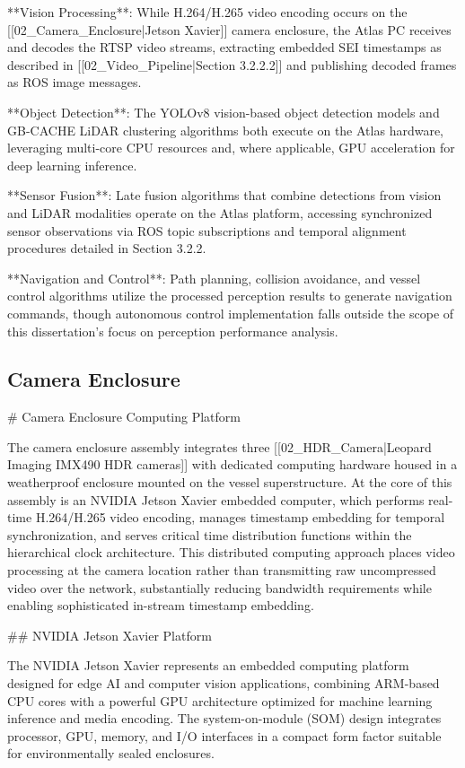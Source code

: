 \documentclass{erauthesis}
\begin{document}
**Vision Processing**: While H.264/H.265 video encoding occurs on the [[02_Camera_Enclosure|Jetson Xavier]] camera enclosure, the Atlas PC receives and decodes the RTSP video streams, extracting embedded SEI timestamps as described in [[02_Video_Pipeline|Section 3.2.2.2]] and publishing decoded frames as ROS image messages.

**Object Detection**: The YOLOv8 vision-based object detection models and GB-CACHE LiDAR clustering algorithms both execute on the Atlas hardware, leveraging multi-core CPU resources and, where applicable, GPU acceleration for deep learning inference.

**Sensor Fusion**: Late fusion algorithms that combine detections from vision and LiDAR modalities operate on the Atlas platform, accessing synchronized sensor observations via ROS topic subscriptions and temporal alignment procedures detailed in Section 3.2.2.

**Navigation and Control**: Path planning, collision avoidance, and vessel control algorithms utilize the processed perception results to generate navigation commands, though autonomous control implementation falls outside the scope of this dissertation's focus on perception performance analysis.

\subsection{Camera Enclosure} \label{comp:camera_enclosure}

# Camera Enclosure Computing Platform

The camera enclosure assembly integrates three [[02_HDR_Camera|Leopard Imaging IMX490 HDR cameras]] with dedicated computing hardware housed in a weatherproof enclosure mounted on the vessel superstructure. At the core of this assembly is an NVIDIA Jetson Xavier embedded computer, which performs real-time H.264/H.265 video encoding, manages timestamp embedding for temporal synchronization, and serves critical time distribution functions within the hierarchical clock architecture. This distributed computing approach places video processing at the camera location rather than transmitting raw uncompressed video over the network, substantially reducing bandwidth requirements while enabling sophisticated in-stream timestamp embedding.

## NVIDIA Jetson Xavier Platform

The NVIDIA Jetson Xavier represents an embedded computing platform designed for edge AI and computer vision applications, combining ARM-based CPU cores with a powerful GPU architecture optimized for machine learning inference and media encoding. The system-on-module (SOM) design integrates processor, GPU, memory, and I/O interfaces in a compact form factor suitable for environmentally sealed enclosures.
\end{document}
